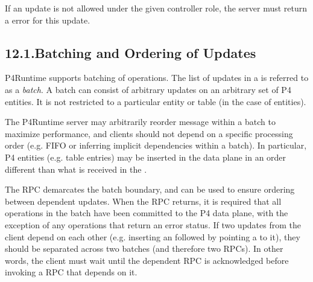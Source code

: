 \documentclass[11pt]{article}
\begin{document}
{%
If an update is not allowed under the given controller role, the server must
return a  error for this update.%

\subsection{12.1.\hspace*{0.5em}Batching and Ordering of Updates}\label{sec-batching-and-ordering-of-updates}%

\noindent{}P4Runtime supports batching of  operations. The list of updates in a
 is referred to as a \emph{batch}. A batch can consist of arbitrary
updates on an arbitrary set of P4 entities. It is not restricted to a particular
entity or table (in the case of  entities).%

The P4Runtime server may arbitrarily reorder message within a batch to maximize
performance, and clients should not depend on a specific processing order (e.g.
FIFO or inferring implicit dependencies within a batch). In particular, P4
entities (e.g. table entries) may be inserted in the data plane in an order
different than what is received in the .%

The  RPC demarcates the batch boundary, and can be used to ensure
ordering between dependent updates. When the  RPC returns, it is required
that all operations in the batch have been committed to the P4 data plane,
with the exception of any operations that return an error status.
If two updates from the client depend on each other (e.g. inserting an
 followed by pointing a  to it), they should be
separated across two batches (and therefore two  RPCs). In other words,
the client must wait until the dependent  RPC is acknowledged before
invoking a  RPC that depends on it.%

}
\end{document}
